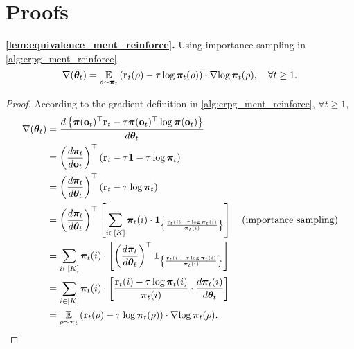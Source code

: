 \section{Proofs}

{\bf \cref{lem:equivalence_ment_reinforce}.} Using importance sampling in \cref{alg:erpg_ment_reinforce},
\begin{equation*}
    \nabla{({\boldsymbol{\theta}}_t)} = \operatorname*{{\mathbb{E}}}\limits_{\rho \sim {\boldsymbol{\pi}}_t}{ \left( {\mathbf{r}}_t(\rho) - \tau \log{{\boldsymbol{\pi}}_t(\rho)} \right) \cdot \nabla{ \log{{\boldsymbol{\pi}}_t(\rho)} } }, \quad \forall t \ge 1.
\end{equation*}
\begin{proof}
According to the gradient definition in \cref{alg:erpg_ment_reinforce}, $\forall t \ge 1$,
\begin{equation*}
\begin{split}
    \nabla{({\boldsymbol{\theta}}_t)} &= \frac{d \left\{ {\boldsymbol{\pi}}({\mathbf{o}}_t)^\top {\mathbf{r}}_t - \tau  {\boldsymbol{\pi}}({\mathbf{o}}_t)^\top \log{{\boldsymbol{\pi}}({\mathbf{o}}_t)} \right\} }{d {\boldsymbol{\theta}}_t} \\
    &= \left( \frac{d {\boldsymbol{\pi}}_t}{d {\mathbf{o}}_t} \right)^\top \left( {\mathbf{r}}_t - \tau {\mathbf{1}} - \tau \log{{\boldsymbol{\pi}}_t} \right) \\
    &= \left( \frac{d {\boldsymbol{\pi}}_t}{d {\boldsymbol{\theta}}_t} \right)^\top \left( {\mathbf{r}}_t - \tau \log{{\boldsymbol{\pi}}_t} \right) \\
    &= \left( \frac{d {\boldsymbol{\pi}}_t}{d {\boldsymbol{\theta}}_t} \right)^\top \left[ \sum\limits_{i \in [K]}{ {\boldsymbol{\pi}}_t(i) \cdot {\mathbf{1}}_{ \left\{ \frac{{\mathbf{r}}_t(i) - \tau \log{{\boldsymbol{\pi}}_t(i)} }{{\boldsymbol{\pi}}_t(i)} \right\} } } \right] \quad \left( \text{importance sampling} \right) \\
    &= \sum\limits_{i \in [K]}{ {\boldsymbol{\pi}}_t(i) \cdot \left[ \left( \frac{d {\boldsymbol{\pi}}_t}{d {\boldsymbol{\theta}}_t} \right)^\top {\mathbf{1}}_{ \left\{ \frac{{\mathbf{r}}_t(i) - \tau \log{{\boldsymbol{\pi}}_t(i)} }{{\boldsymbol{\pi}}_t(i)} \right\} } \right] } \\
    &= \sum\limits_{i \in [K]}{ {\boldsymbol{\pi}}_t(i) \cdot \left[ \frac{{\mathbf{r}}_t(i) - \tau  \log{{\boldsymbol{\pi}}_t(i)} }{{\boldsymbol{\pi}}_t(i)} \cdot \frac{d {\boldsymbol{\pi}}_t(i)}{d {\boldsymbol{\theta}}_t}  \right] } \\
    &= \operatorname*{{\mathbb{E}}}\limits_{\rho \sim {\boldsymbol{\pi}}_t}{ \left( {\mathbf{r}}_t(\rho) - \tau  \log{{\boldsymbol{\pi}}_t(\rho)} \right) \cdot \nabla{ \log{{\boldsymbol{\pi}}_t(\rho)} } }. \qedhere
\end{split}
\end{equation*}
\end{proof}


